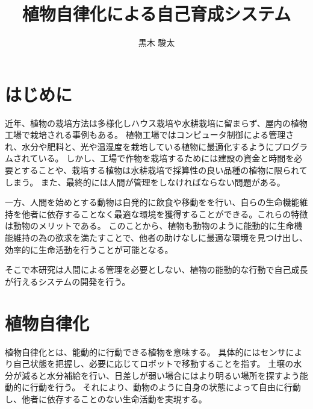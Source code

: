 \documentclass[10pt]{jsarticle}
\begin{document}
\pagestyle{empty}

\setlength{\baselineskip}{13truept}

\title{植物自律化による自己育成システム}
\author{黒木 駿太}

\maketitle
\thispagestyle{empty}

\section{はじめに}
近年、植物の栽培方法は多様化しハウス栽培や水耕栽培に留まらず、屋内の植物工場で栽培される事例もある。
植物工場ではコンピュータ制御による管理され、水分や肥料と、光や温湿度を栽培している植物に最適化するようにプログラムされている。
しかし、工場で作物を栽培するためには建設の資金と時間を必要とすることや、栽培する植物は水耕栽培で採算性の良い品種の植物に限られてしまう。
また、最終的には人間が管理をしなければならない問題がある。

一方、人間を始めとする動物は自発的に飲食や移動をを行い、自らの生命機能維持を他者に依存することなく最適な環境を獲得することができる。これらの特徴は動物のメリットである。
このことから、植物も動物のように能動的に生命機能維持の為の欲求を満たすことで、他者の助けなしに最適な環境を見つけ出し、効率的に生命活動を行うことが可能となる。

そこで本研究は人間による管理を必要としない、植物の能動的な行動で自己成長が行えるシステムの開発を行う。

\section{植物自律化}
植物自律化とは、能動的に行動できる植物を意味する。
具体的にはセンサにより自己状態を把握し、必要に応じてロボットで移動することを指す。
土壌の水分が減ると水分補給を行い、日差しが弱い場合にはより明るい場所を探すよう能動的に行動を行う。
それにより、動物のように自身の状態によって自由に行動し、他者に依存することのない生命活動を実現する。
\end{document}
